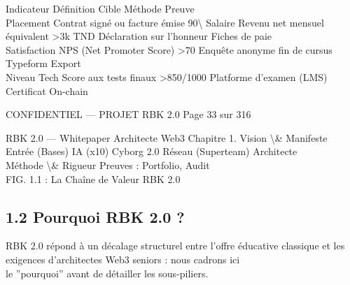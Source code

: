 \documentclass[12pt,landscape,a4paper]{article}
\newenvironment{confidential}
{\begin{tcolorbox}[
    colback=rbkred!5!white,
    colframe=rbkred!75!black,
    title=CONFIDENTIEL,
    fonttitle=\bfseries\color{white},
    coltitle=rbkred!75!black,
    breakable,
    enhanced,
    frame hidden,
    borderline west={2pt}{0pt}{rbkred!75!black}
]}
{\end{tcolorbox}}
\begin{document}
Indicateur     Définition                         Cible     Méthode                         Preuve\\
Placement      Contrat signé ou facture émise     90\textbackslash{}%
Salaire        Revenu net mensuel équivalent     \textgreater{}3k TND    Déclaration sur l’honneur       Fiches de paie\\
Satisfaction   NPS (Net Promoter Score)           \textgreater{}70       Enquête anonyme fin de cursus   Typeform Export\\
Niveau Tech    Score aux tests finaux           \textgreater{}850/1000   Platforme d’examen (LMS)        Certificat On-chain\\
\vspace{0.5em}
\vspace{0.5em}
\vspace{0.5em}
\vspace{0.5em}
\begin{confidential}CONFIDENTIEL — PROJET RBK 2.0                                  Page 33 sur 316\end{confidential}
RBK 2.0 — Whitepaper Architecte Web3                                                                                    Chapitre 1. Vision \textbackslash{}& Manifeste\\
\vspace{0.5em}
\vspace{0.5em}
Entrée (Bases)      IA (x10)        Cyborg 2.0       Réseau (Superteam)     Architecte\\
Méthode \textbackslash{}& Rigueur                    Preuves : Portfolio, Audit\\
\vspace{0.5em}
FIG. 1.1 : La Chaîne de Valeur RBK 2.0\\
\vspace{0.5em}
\vspace{0.5em}
\vspace{0.5em}
\subsection{1.2 Pourquoi RBK 2.0 ?}
RBK 2.0 répond à un décalage structurel entre l’offre éducative classique et les exigences d’architectes Web3 seniors : nous cadrons ici\\
le ”pourquoi” avant de détailler les sous-piliers.\\
\vspace{0.5em}
\end{document}
